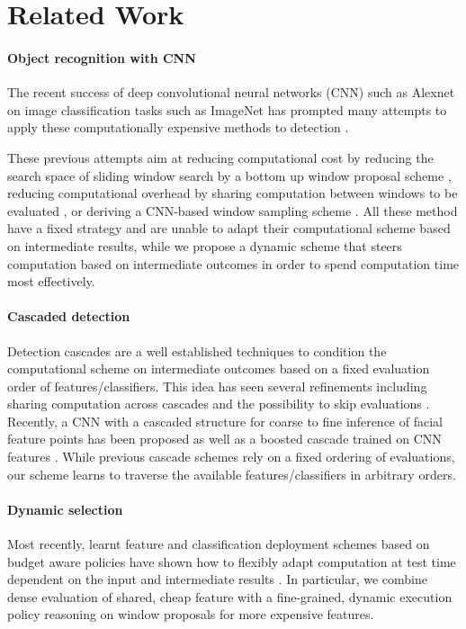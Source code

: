 \section{Related Work}\label{sec:related}

\paragraph{Object recognition with CNN}\label{object-recognition-with-cnn}

The recent success of deep convolutional neural networks (CNN) such as Alexnet \cite{Krizhevsky-NIPS-2012} on image classification tasks such as ImageNet \cite{deng2009cvpr} has prompted many attempts to apply these computationally expensive methods to detection \cite{Girshick-CVPR-2014,Zou-CVPR-2014,Simonyan-ICLR-2014,Sermanet-ICLR-2014} .

These previous attempts aim at reducing computational cost by reducing the search space of sliding window search by a bottom up window proposal scheme \cite{Girshick-CVPR-2014}, reducing computational overhead by sharing computation between windows to be evaluated \cite{Zou-CVPR-2014,Sermanet-ICLR-2014}, or deriving a CNN-based window sampling scheme \cite{Simonyan-ICLR-2014}.
All these method have a fixed strategy and are unable to adapt their computational scheme based on intermediate results, while we propose a dynamic scheme that steers computation based on intermediate outcomes in order to spend computation time most effectively.

\paragraph{Cascaded detection}\label{cascaded-detection}
Detection cascades \cite{Viola2004,Felzenszwalb-CVPR-2010} are a well established techniques to condition the computational scheme on intermediate outcomes based on a fixed evaluation order of features/classifiers. This idea has seen several refinements including sharing computation across cascades \cite{Dollar-ECCV-2012} and the possibility to skip evaluations \cite{benbouzid12icml}. Recently, a CNN with a cascaded structure for coarse to fine inference of facial feature points has been proposed \cite{cnn_cascade} as well as a boosted cascade trained on CNN features \cite{Zou-CVPR-2014}. While previous cascade schemes rely on a fixed ordering of evaluations, our scheme learns to traverse the available features/classifiers in arbitrary orders.

\paragraph{Dynamic selection}\label{dynamic-selection}
Most recently, learnt feature and classification deployment schemes based on budget aware policies have shown how to flexibly adapt computation at test time dependent on the input and intermediate results \cite{Karayev-NIPS-2012,dulac2014}.
In particular, we combine  dense evaluation of shared, cheap feature with a fine-grained, dynamic execution policy reasoning on window proposals for more expensive features.
